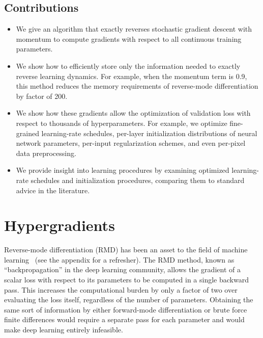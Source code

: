 \documentclass{article}
\begin{document}
\subsection{Contributions}

\begin{itemize}
\item We give an algorithm that exactly reverses stochastic gradient descent with momentum to compute gradients with respect to all continuous training parameters.
\item We show how to efficiently store only the information needed to exactly reverse learning dynamics.
For example, when the momentum term is 0.9, this method reduces the memory requirements of reverse-mode differentiation by factor of 200.
\item We show how these gradients allow the optimization of validation loss with respect to thousands of hyperparameters.
For example, we optimize fine-grained learning-rate schedules, per-layer initialization distributions of neural network parameters, per-input regularization schemes, and even per-pixel data preprocessing.
\item We provide insight into learning procedures by examining optimized learning-rate schedules and initialization procedures, comparing them to standard advice in the literature.
\end{itemize}

\section{Hypergradients}
\label{sec:hypergradients}

Reverse-mode differentiation (RMD) has been an asset to the field of machine
learning~\citep{lecun1989backpropagation} (see the appendix for a refresher). The RMD method, known as
``backpropagation'' in the deep learning community, allows the gradient of a
scalar loss with respect to its parameters to be computed in a single backward
pass.
This increases the computational burden by only a factor of two over
evaluating the loss itself, regardless of the number of parameters.
Obtaining the same sort of information by either forward-mode
differentiation or brute force finite differences would require a separate pass
for each parameter and would make deep learning entirely infeasible.
\end{document}
